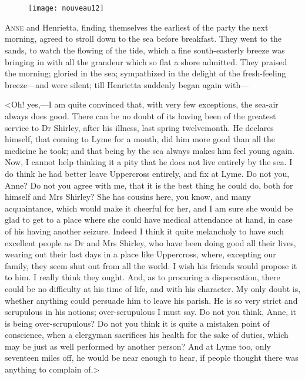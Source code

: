 \chapter[Chapter \thechapter]{}
	
	\begin{figure}[t!]
\centering
\texttt{[image: nouveau12]}
\end{figure}

\lettrine[lraise=0.3]{A}{nne} and Henrietta, finding themselves the earliest of the party the next morning, agreed to stroll down to the sea before breakfast. They went to the sands, to watch the flowing of the tide, which a fine south-easterly breeze was bringing in with all the grandeur which so flat a shore admitted. They praised the morning; gloried in the sea; sympathized in the delight of the fresh-feeling breeze—and were silent; till Henrietta suddenly began again with—

<Oh! yes,—I am quite convinced that, with very few exceptions, the sea-air always does good. There can be no doubt of its having been of the greatest service to Dr Shirley, after his illness, last spring twelvemonth. He declares himself, that coming to Lyme for a month, did him more good than all the medicine he took; and that being by the sea always makes him feel young again. Now, I cannot help thinking it a pity that he does not live entirely by the sea. I do think he had better leave Uppercross entirely, and fix at Lyme. Do not you, Anne? Do not you agree with me, that it is the best thing he could do, both for himself and Mrs Shirley? She has cousins here, you know, and many acquaintance, which would make it cheerful for her, and I am sure she would be glad to get to a place where she could have medical attendance at hand, in case of his having another seizure. Indeed I think it quite melancholy to have such excellent people as Dr and Mrs Shirley, who have been doing good all their lives, wearing out their last days in a place like Uppercross, where, excepting our family, they seem shut out from all the world. I wish his friends would propose it to him. I really think they ought. And, as to procuring a dispensation, there could be no difficulty at his time of life, and with his character. My only doubt is, whether anything could persuade him to leave his parish. He is so very strict and scrupulous in his notions; over-scrupulous I must say. Do not you think, Anne, it is being over-scrupulous? Do not you think it is quite a mistaken point of conscience, when a clergyman sacrifices his health for the sake of duties, which may be just as well performed by another person? And at Lyme too, only seventeen miles off, he would be near enough to hear, if people thought there was anything to complain of.>

